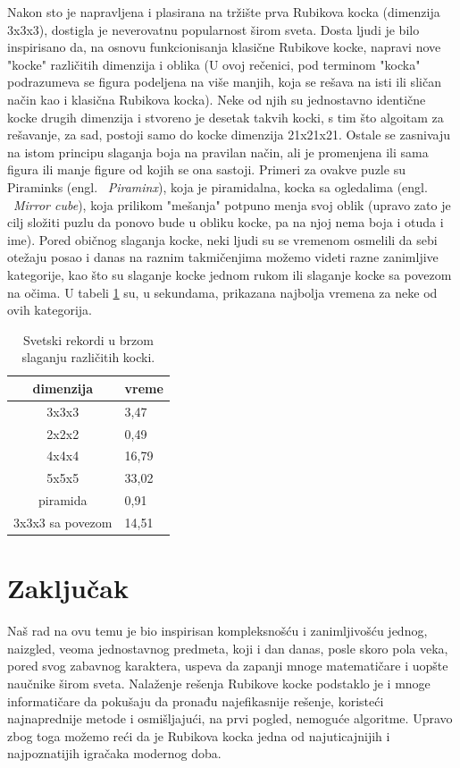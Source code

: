 \documentclass[a4paper]{article}
\begin{document}
Nakon sto je napravljena i plasirana na tržište prva Rubikova kocka (dimenzija 3x3x3), dostigla je neverovatnu popularnost širom sveta. Dosta ljudi je bilo inspirisano da, na osnovu funkcionisanja klasične Rubikove kocke, napravi nove "kocke" različitih dimenzija i oblika (U ovoj rečenici, pod terminom "kocka" podrazumeva se figura podeljena na više manjih, koja se rešava na isti ili sličan način kao i klasična Rubikova kocka). Neke od njih su jednostavno identične kocke drugih dimenzija i stvoreno je desetak takvih kocki, s tim što algoitam za rešavanje, za sad, postoji samo do kocke dimenzija 21x21x21. Ostale se zasnivaju na istom principu slaganja boja na pravilan način, ali je promenjena ili sama figura ili manje figure od kojih se ona sastoji. Primeri za ovakve puzle su Piraminks (engl. ~{\em Piraminx}), koja je piramidalna, kocka sa ogledalima (engl. ~{\em Mirror cube}), koja prilikom "mešanja" potpuno menja svoj oblik (upravo zato je cilj složiti puzlu da ponovo bude u obliku kocke, pa na njoj nema boja i otuda i ime). Pored običnog slaganja kocke, neki ljudi su se vremenom osmelili da sebi otežaju posao i danas na raznim takmičenjima možemo videti razne zanimljive kategorije, kao što su slaganje kocke jednom rukom ili slaganje kocke sa povezom na očima. U tabeli \ref{tab:tabela1} su, u sekundama, prikazana najbolja vremena za neke od ovih kategorija. 

\begin{table}[h!]
\begin{center}
\caption{Svetski rekordi u brzom slaganju različitih kocki.}
\begin{tabular}{|c|l|} \hline
dimenzija& vreme\\ \hline
3x3x3 &3,47\\ \hline
2x2x2 &0,49\\ \hline
4x4x4 &16,79\\ \hline
5x5x5 &33,02\\ \hline
piramida &0,91\\ \hline
3x3x3 sa povezom &14,51\\ \hline
\end{tabular}
\label{tab:tabela1}
\end{center}
\end{table}

\section{Zaključak}
\label{sec:zakljucak}

Naš rad na ovu temu je bio inspirisan kompleksnošću i zanimljivošću jednog, naizgled, veoma jednostavnog predmeta, koji i dan danas, posle skoro pola veka, pored svog zabavnog karaktera, uspeva da zapanji mnoge matematičare i uopšte naučnike širom sveta. Nalaženje rešenja Rubikove kocke podstaklo je i mnoge informatičare da pokušaju da pronađu najefikasnije rešenje, koristeći najnaprednije metode i osmišljajući, na prvi pogled, nemoguće algoritme. Upravo zbog toga možemo reći da je Rubikova kocka jedna od najuticajnijih i najpoznatijih igračaka modernog doba.
 \pagebreak
\end{document}

